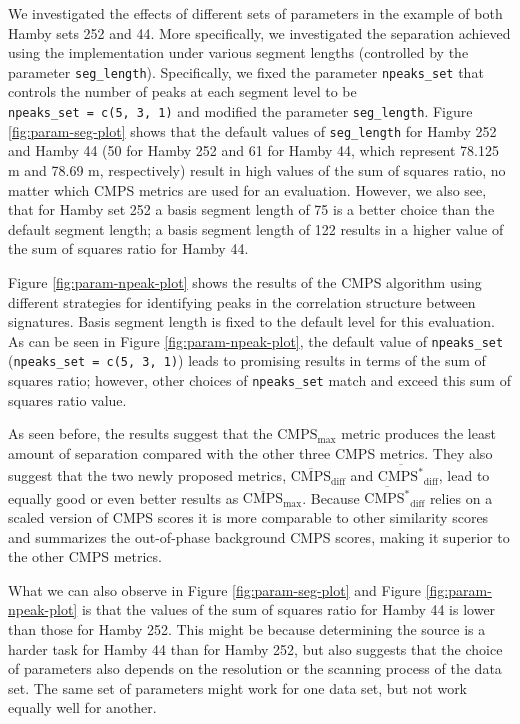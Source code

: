 We investigated the effects of different sets of parameters in the
example of both Hamby sets 252 and 44. More specifically, we
investigated the separation achieved using the 
implementation under various segment lengths (controlled by the
parameter \texttt{seg\_length}). Specifically, we fixed the parameter
\texttt{npeaks\_set} that controls the number of peaks at each segment
level to be \texttt{npeaks\_set\ =\ c(5,\ 3,\ 1)} and modified the
parameter \texttt{seg\_length}. Figure \ref{fig:param-seg-plot} shows
that the default values of \texttt{seg\_length} for Hamby 252 and Hamby
44 (50 for Hamby 252 and 61 for Hamby 44, which represent 78.125
\textmu m and 78.69 \textmu m, respectively) result in high values of
the sum of squares ratio, no matter which CMPS metrics are used for an
evaluation. However, we also see, that for Hamby set 252 a basis segment
length of 75 is a better choice than the default segment length; a basis
segment length of 122 results in a higher value of the sum of squares
ratio for Hamby 44.

Figure \ref{fig:param-npeak-plot} shows the results of the CMPS
algorithm using different strategies for identifying peaks in the
correlation structure between signatures. Basis segment length is fixed
to the default level for this evaluation. As can be seen in Figure
\ref{fig:param-npeak-plot}, the default value of \texttt{npeaks\_set}
(\texttt{npeaks\_set\ =\ c(5,\ 3,\ 1)}) leads to promising results in
terms of the sum of squares ratio; however, other choices of
\texttt{npeaks\_set} match and exceed this sum of squares ratio value.

As seen before, the results suggest that the \(\mathrm{CMPS_{max}}\)
metric produces the least amount of separation compared with the other
three CMPS metrics. They also suggest that the two newly proposed
metrics, \(\mathrm{\overline{CMPS}_{diff}}\) and
\(\mathrm{\overline{CMPS^*}_{diff}}\), lead to equally good or even
better results as \(\mathrm{\overline{CMPS}_{max}}\). Because
\(\mathrm{\overline{CMPS^*}_{diff}}\) relies on a scaled version of CMPS
scores it is more comparable to other similarity scores and summarizes
the out-of-phase background CMPS scores, making it superior to the other
CMPS metrics.

What we can also observe in Figure \ref{fig:param-seg-plot} and Figure
\ref{fig:param-npeak-plot} is that the values of the sum of squares
ratio for Hamby 44 is lower than those for Hamby 252. This might be
because determining the source is a harder task for Hamby 44 than for
Hamby 252, but also suggests that the choice of parameters also depends
on the resolution or the scanning process of the data set. The same set
of parameters might work for one data set, but not work equally well for
another.

